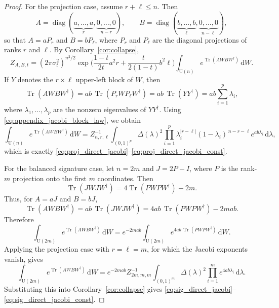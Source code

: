 \documentclass[11pt,a4paper]{article}
\theoremstyle{definition}\newtheorem{definition}[theorem]{Definition}
\theoremstyle{remark}\newtheorem{remark}[theorem]{Remark}
\numberwithin{equation}{section}
\DeclareMathOperator{\Tr}{Tr}
\DeclareMathOperator{\diag}{diag}
\newcommand{\dd}{\mathrm{d}}
\newcommand{\UU}{\mathrm{U}(n)}
\begin{document}
\begin{proof} 
For the projection case, assume $r+\ell\le n$. Then
\begin{equation}
A=\diag(\underbrace{a,\dots,a}_{r},\underbrace{0,\dots,0}_{n-r}),
\qquad
B=\diag(\underbrace{b,\dots,b}_{\ell},\underbrace{0,\dots,0}_{n-\ell}),
\end{equation}
so that $A=aP_r$ and $B=bP_\ell$, where $P_r$ and $P_\ell$ are the
diagonal projections of ranks $r$ and $\ell$. By
Corollary~\ref{cor:collapse},
\begin{equation}
Z_{A,B,t}
=
(2\pi\sigma_t^2)^{n^2/2}
\exp\!\Big(\frac{1-t}{2t}a^2r+\frac{t}{2(1-t)}b^2\ell\Big)
\int_{\UU} e^{\Tr(AWBW^\dagger)}\,\dd W.
\end{equation}
If $Y$ denotes the $r\times \ell$ upper-left block of $W$, then
\begin{equation}
\Tr(AWBW^\dagger)
=
ab\,\Tr(P_rWP_\ell W^\dagger)
=
ab\,\Tr(YY^\dagger)
=
ab\sum_{i=1}^p \lambda_i,
\end{equation}
where $\lambda_1,\dots,\lambda_p$ are the nonzero eigenvalues of $YY^\dagger$.
Using \eqref{eq:appendix_jacobi_block_law}, we obtain
\begin{equation}
\int_{\UU} e^{\Tr(AWBW^\dagger)}\,\dd W
=
Z_{n,r,\ell}^{-1}
\int_{(0,1)^p}
\Delta(\lambda)^2
\prod_{i=1}^{p}
\lambda_i^{|r-\ell|}(1-\lambda_i)^{\,n-r-\ell}
e^{ab\lambda_i}\,\dd \lambda,
\end{equation}
which is exactly \eqref{eq:proj_direct_jacobi}--\eqref{eq:proj_direct_jacobi_const}.

For the balanced signature case, let $n=2m$ and $J=2P-I$,
 where $P$ is the rank-$m$ projection onto the first $m$ coordinates. Then
\begin{equation}
\Tr(JWJW^\dagger)=4\Tr(PWPW^\dagger)-2m.
\end{equation}
Thus, for $A=aJ$ and $B=bJ$,
\begin{equation}
\Tr(AWBW^\dagger)
=
ab\,\Tr(JWJW^\dagger)
=
4ab\,\Tr(PWPW^\dagger)-2mab.
\end{equation}
Therefore
\begin{equation}
\int_{\mathrm U(2m)} e^{\Tr(AWBW^\dagger)}\,\dd W
=
e^{-2mab}
\int_{\mathrm U(2m)} e^{4ab\,\Tr(PWPW^\dagger)}\,\dd W.
\end{equation}
Applying the projection case with $r=\ell=m$, for which the Jacobi exponents
vanish, gives
\begin{equation}
\int_{\mathrm U(2m)} e^{\Tr(AWBW^\dagger)}\,\dd W
=
e^{-2mab} Z_{2m,m,m}^{-1}
\int_{(0,1)^m}
\Delta(\lambda)^2
\prod_{i=1}^{m} e^{4ab\lambda_i}\,\dd \lambda.
\end{equation}
Substituting this into Corollary~\ref{cor:collapse} gives
\eqref{eq:sig_direct_jacobi}--\eqref{eq:sig_direct_jacobi_const}.
\end{proof}

 
\printbibliography
\end{document}
